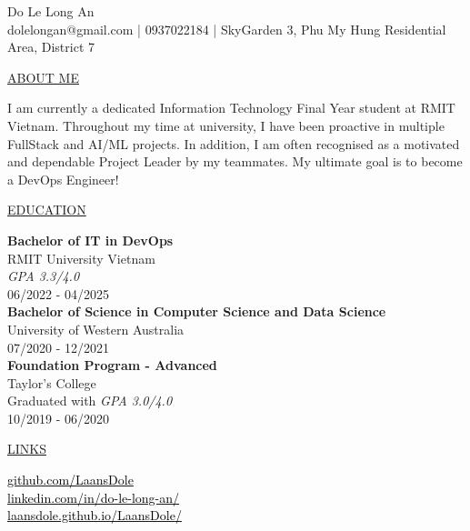 \documentclass[11pt]{article}
\newcommand{\resumetitle}[3]{
    \AddToShipoutPictureBG{
        \AtPageUpperLeft {
        \raisebox{-0.09\paperheight}{
            \color{black!85}\rule{2\paperwidth}{\paperheight}}
        }}
    \begin{Center}
        \begingroup
        \titlethin
        \color{black!10}\Huge{#1}
        \titlethick
        \color{black!5}\Huge{#2} \\
        \vspace{2mm}
        \textrm{\color{black!15}\Large{#3}}
        \endgroup
    \end{Center}
    \vspace{7mm}
}
\newcommand{\betteruline}[1]{
    \uline{#1}
}
\newcommand{\sectiontitle}[1]{
    \begingroup
        \titlebold
        \betteruline{\Large\uppercase{#1}  }
        \vspace{1.7mm}
    \endgroup
}
\newcommand{\sectioncontent}[1]{
    \begingroup
        \begin{FlushLeft}
        \vspace{-3mm}
        \sffamily\small#1
        \end{FlushLeft}
    \endgroup
    \vspace{2mm}
}
\begin{document}
    \resumetitle{Do}{Le Long An} {
        dolelongan@gmail.com |
        0937022184 |
        SkyGarden 3, Phu My Hung Residential Area, District 7
    }

    \setlength{\columnsep}{7mm}
    \begin{paracol}{2}

    \sectiontitle{about me}
    \sectioncontent{
        \vspace{1mm}
        I am currently a dedicated Information Technology Final Year student at RMIT Vietnam. Throughout my time at university, I have been proactive in multiple FullStack and AI/ML projects. In addition, I am often recognised as a motivated and dependable Project Leader by my teammates. My ultimate goal is to become a DevOps Engineer!
    }

    \sectiontitle{education}
    \sectioncontent{
        \vspace{1mm}
        \textbf{Bachelor of IT in DevOps} \\
        RMIT University Vietnam \\
        \textit{GPA 3.3/4.0} \\
        \vspace{1mm}
        \textcolor{black!70}{06/2022 - 04/2025} \\
        \vspace{2mm}
        \textbf{Bachelor of Science in Computer Science and Data Science} \\
        University of Western Australia \\
        \vspace{1mm}
        \textcolor{black!70}{07/2020 - 12/2021} \\
         \vspace{2mm}
         \textbf{Foundation Program - Advanced} \\
        Taylor's College \\
        Graduated with \textit{GPA 3.0/4.0} \\
        \vspace{1mm}
        \textcolor{black!70}{10/2019 - 06/2020} \\
    }

    \sectiontitle{links}
    \sectioncontent{
        \vspace{1mm}
        \hspace{3mm}
        \href{https://github.com/LaansDole}{\textcolor{black}{github.com/LaansDole}} \\
        \vspace{2mm}
        \faIcon{linkedin-in}\hspace{3mm}
        \href{https://www.linkedin.com/in/do-le-long-an/}{\textcolor{black}{linkedin.com/in/do-le-long-an/}} \\
        \vspace{2mm}
        \faIcon{address-card}\hspace{3mm}
        \href{https://laansdole.github.io/LaansDole/}{\textcolor{black}{laansdole.github.io/LaansDole/}} \\
    }


\end{paracol}
\end{document}
